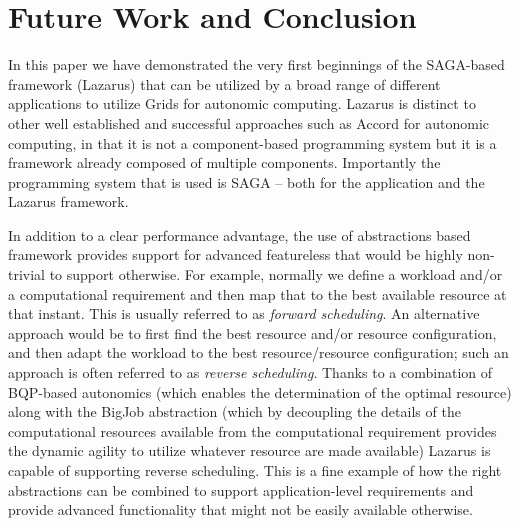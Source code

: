 \documentclass[conference,final]{IEEEtran}
\newcommand{\jhanote}[1]{ {\textcolor{red} { ***Jha: #1 }}}
\newcommand{\jhanote}[1]{}
\begin{document}
\section{Future Work and Conclusion}


In this paper we have demonstrated the very first beginnings of the
SAGA-based framework (Lazarus) that can be utilized by a broad range
of different applications to utilize Grids for autonomic computing.
Lazarus is distinct to other well established and successful
approaches such as Accord for autonomic computing, in that it is not a
component-based programming system but it is a framework already
composed of multiple components. Importantly the programming system
that is used is SAGA -- both for the application and the Lazarus
framework.

In addition to a clear performance advantage, the use of abstractions
based framework provides support for advanced featureless that would be
highly non-trivial to support otherwise.  For example, normally we
define a workload and/or a computational requirement and then map that
to the best available resource at that instant.  This is usually
referred to as {\it forward scheduling}.  An alternative approach
would be to first find the best resource and/or resource
configuration, and then adapt the workload to the best
resource/resource configuration; such an approach is often referred to
as {\it reverse scheduling}.  Thanks to a combination of BQP-based
autonomics (which enables the determination of the optimal resource)
along with the BigJob abstraction (which by decoupling the details of
the computational resources available from the computational
requirement provides the dynamic agility to utilize whatever resource
are made available) Lazarus is capable of supporting reverse
scheduling. This is a fine example of how the right abstractions can
be combined to support application-level requirements and provide
advanced functionality that might not be easily available otherwise.
\end{document}
